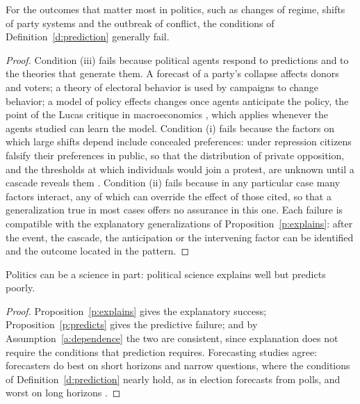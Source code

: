 \documentclass{situationist-preprint}
\begin{document}
\begin{proposition}\label{p:predicts}
For the outcomes that matter most in politics, such as changes of regime, shifts of party systems and the outbreak of conflict, the conditions of Definition~\ref{d:prediction} generally fail.
\end{proposition}

\begin{proof}
Condition (iii) fails because political agents respond to predictions and to the theories that generate them. A forecast of a party's collapse affects donors and voters; a theory of electoral behavior is used by campaigns to change behavior; a model of policy effects changes once agents anticipate the policy, the point of the Lucas critique in macroeconomics \citep{Lucas1976}, which applies whenever the agents studied can learn the model. Condition (i) fails because the factors on which large shifts depend include concealed preferences: under repression citizens falsify their preferences in public, so that the distribution of private opposition, and the thresholds at which individuals would join a protest, are unknown until a cascade reveals them \citep{Kuran1991}. Condition (ii) fails because in any particular case many factors interact, any of which can override the effect of those cited, so that a generalization true in most cases offers no assurance in this one. Each failure is compatible with the explanatory generalizations of Proposition~\ref{p:explains}: after the event, the cascade, the anticipation or the intervening factor can be identified and the outcome located in the pattern.
\end{proof}

\begin{theorem}\label{t:main}
Politics can be a science in part: political science explains well but predicts poorly.
\end{theorem}

\begin{proof}
Proposition~\ref{p:explains} gives the explanatory success; Proposition~\ref{p:predicts} gives the predictive failure; and by Assumption~\ref{a:dependence} the two are consistent, since explanation does not require the conditions that prediction requires. Forecasting studies agree: forecasters do best on short horizons and narrow questions, where the conditions of Definition~\ref{d:prediction} nearly hold, as in election forecasts from polls, and worst on long horizons \citep{Tetlock2005}.
\end{proof}
\end{document}
